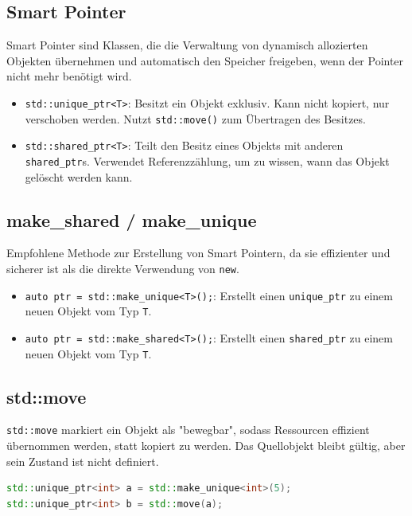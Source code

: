 \documentclass[9pt, a3paper, landscape]{article}
\begin{document}
\begin{multicols*}{4}
\section{Smart Pointer}

Smart Pointer sind Klassen, die die Verwaltung von dynamisch allozierten Objekten übernehmen und automatisch den Speicher freigeben, wenn der Pointer nicht mehr benötigt wird.

\begin{itemize}
    \item \lstinline|std::unique_ptr<T>|: Besitzt ein Objekt exklusiv. Kann nicht kopiert, nur verschoben werden. Nutzt \lstinline|std::move()| zum Übertragen des Besitzes.
    \item \lstinline|std::shared_ptr<T>|: Teilt den Besitz eines Objekts mit anderen \lstinline|shared_ptr|s. Verwendet Referenzzählung, um zu wissen, wann das Objekt gelöscht werden kann.
\end{itemize}

\newline\newline
\subsection*{make\_shared / make\_unique}

Empfohlene Methode zur Erstellung von Smart Pointern, da sie effizienter und sicherer ist als die direkte Verwendung von \lstinline|new|.

\begin{itemize}
    \item \lstinline|auto ptr = std::make_unique<T>();|: Erstellt einen \lstinline|unique_ptr| zu einem neuen Objekt vom Typ \lstinline|T|.
    \item \lstinline|auto ptr = std::make_shared<T>();|: Erstellt einen \lstinline|shared_ptr| zu einem neuen Objekt vom Typ \lstinline|T|.
\end{itemize}

\subsection*{std::move}

\lstinline|std::move| markiert ein Objekt als "bewegbar", sodass Ressourcen effizient übernommen werden, statt kopiert zu werden. Das Quellobjekt bleibt gültig, aber sein Zustand ist nicht definiert.
\begin{lstlisting}[language=C++]
std::unique_ptr<int> a = std::make_unique<int>(5);
std::unique_ptr<int> b = std::move(a); 
\end{lstlisting}










\end{multicols*}
\end{document}
